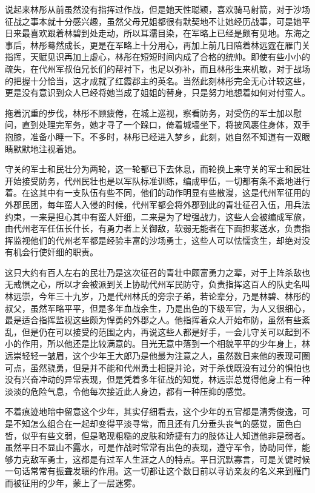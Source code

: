 说起来林彤从前虽然没有指挥过作战，但是她天性聪颖，喜欢骑马射箭，对于沙场征战之事本就十分感兴趣，虽然父母兄姐都很有默契地不让她经历战事，可是她平日来最喜欢跟着林碧到处走动，所以耳濡目染，在军略上已经是颇有见地。东海之事后，林彤蓦然成长，更是在军略上十分用心，再加上前几日陪着林远霆在雁门关指挥，天赋见识再加上虚心，林彤在短短时间内成了合格的统帅。即使有些小小的疏失，在代州军叔伯兄长们的帮衬下，也足以弥补，而且林彤生来机敏，对于战场的把握十分恰当，这才成就了红霞郡主的英名。当然此刻林彤完全无心计较这些，更是没有意识到众人已经将她当成了姐姐的替身，只是努力地想着如何对付蛮人。

拖着沉重的步伐，林彤不顾疲倦，在城上巡视，察看防务，对受伤的军士加以慰问，直到处理完军务，她才寻了一个跺口，倚着城墙坐下，将披风裹住身体，双手抱膝，准备小睡一下。不多时，林彤已经进入梦乡，此刻，她自然不知道有一双眼睛默默地注视着她。

守关的军士和民壮分为两轮，这一轮都已下去休息，而轮换上来守关的军士和民壮开始接受防务，代州民壮也是以军队标准训练，编成甲伍，一切都有条不紊地进行着。在这其中有一支队伍有些不同，他们的动作明显有些散漫，这是代州军征用的外郡民团，每年蛮人入侵的时候，代州军都会将外郡到此的青壮征召入伍，用兵法约束，一来是担心其中有蛮人奸细，二来是为了增强战力，这些人会被编成军旅，由代州老军任伍长什长，有勇力者上关御敌，软弱无能者在下面担浆送水，负责指挥监视他们的代州老军都是经验丰富的沙场勇士，这些人可以怯懦贪生，却绝对没有机会行使奸细的职责。

这只大约有百人左右的民壮乃是这次征召的青壮中颇富勇力之辈，对于上阵杀敌也无戒惧之心，所以才会被派到关上协助代州军民防守，负责指挥这百人的队史名叫林远崇，今年三十九岁，乃是代州林氏的旁宗子弟，若论辈分，乃是林碧、林彤的叔父，虽然军略平平，但是多年血战余生，乃是出色的下级军官，为人又很细心，最是适合指挥监视这些颇为悍勇的外郡之人。他指挥着众人开始布防，虽然有些紊乱，但是仍在可以接受的范围之内，再说这些人都是好手，一会儿守关可以起到不小的作用，所以他还是比较满意的。目光无意中落到一个相貌平平的少年身上，林远崇轻轻一皱眉，这个少年王大郎乃是他最为注意之人，虽然数日来他的表现可圈可点，虽然骁勇，但是并不能和代州勇士相提并论，对于杀伐既没有过分的惧怕也没有兴奋冲动的异常表现，但是凭着多年征战的知觉，林远崇总觉得他身上有一种淡淡的危险气息，令他每次接近此人身边，都有一种压抑的感觉。

不着痕迹地暗中留意这个少年，其实仔细看去，这个少年的五官都是清秀俊逸，可是不知怎么组合在一起却变得平淡寻常，而且还有几分垂头丧气的感觉，面色白皙，似乎有些文弱，但是略现粗糙的皮肤和矫捷有力的肢体让人知道他非是弱者。虽然平日不显山不露水，可是作战时常常有出色的表现，遵守军令，协助同伴，能够力克敌军勇士，这都是有过军人生涯之人的特点。平日沉默寡言，可是关键时候一句话常常有振聋发聩的作用。这一切都让这个数日前以寻访亲友的名义来到雁门而被征用的少年，蒙上了一层迷雾。

